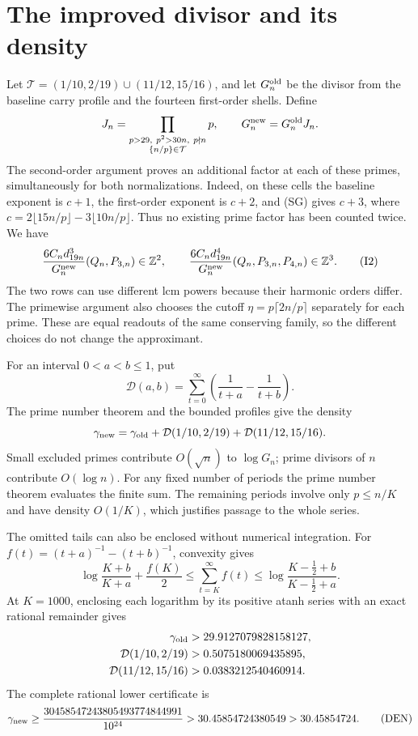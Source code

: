 \documentclass[11pt]{article}
\begin{document}
\section{The improved divisor and its density}
Let $\mathcal T=(1/10,2/19)\cup(11/12,15/16)$, and let
$G_n^{\rm old}$ be the divisor from the baseline carry profile and the
fourteen first-order shells. Define
\[
 J_n=\prod_{\substack{p>29,\ p^2>30n,\ p\nmid n\\
                  \{n/p\}\in\mathcal T}}p,
 \qquad G_n^{\rm new}=G_n^{\rm old}J_n.
\]
The second-order argument proves an additional factor at each of these
primes, simultaneously for both normalizations. Indeed, on these cells
the baseline exponent is $c+1$, the first-order exponent is $c+2$, and
(SG) gives $c+3$, where $c=2\lfloor15n/p\rfloor-3\lfloor10n/p\rfloor$.
Thus no existing prime factor has been counted twice. We have
\[
 \frac{6C_nd_{19n}^3}{G_n^{\rm new}}(Q_n,P_{3,n})\in\mathbb Z^2,
 \qquad
 \frac{6C_nd_{19n}^4}{G_n^{\rm new}}(Q_n,P_{3,n},P_{4,n})
     \in\mathbb Z^3.                                      \tag{I2}
\]
The two rows can use different lcm powers because their harmonic orders
differ. The primewise argument also chooses the cutoff
$\eta=p\lceil2n/p\rceil$ separately for each prime. These are equal
readouts of the same conserving family, so the different choices do not
change the approximant.

For an interval $0<a<b\le1$, put
\[
 \mathcal D(a,b)=\sum_{t=0}^{\infty}
             \left(\frac1{t+a}-\frac1{t+b}\right).
\]
The prime number theorem and the bounded profiles give the density
\[
 \gamma_{\rm new}=\gamma_{\rm old}
       +\mathcal D(1/10,2/19)+\mathcal D(11/12,15/16).
\]
Small excluded primes contribute $O(\sqrt n)$ to $\log G_n$; prime
divisors of $n$ contribute $O(\log n)$. For any fixed number of periods
the prime number theorem evaluates the finite sum. The remaining
periods involve only $p\le n/K$ and have density $O(1/K)$, which
justifies passage to the whole series.

The omitted tails can also be enclosed without numerical integration.
For $f(t)=(t+a)^{-1}-(t+b)^{-1}$, convexity gives
\[
 \log\frac{K+b}{K+a}+\frac{f(K)}2
 \le\sum_{t=K}^{\infty}f(t)
 \le\log\frac{K-\frac12+b}{K-\frac12+a}.
\]
At $K=1000$, enclosing each logarithm by its positive atanh series with
an exact rational remainder gives
\[
\begin{aligned}
 \gamma_{\rm old}&>29.9127079828158127,\\
 \mathcal D(1/10,2/19)&>0.5075180069435895,\\
 \mathcal D(11/12,15/16)&>0.0383212540460914.
\end{aligned}
\]
The complete rational lower certificate is
\[
 \gamma_{\rm new}\ge
 \frac{30458547243805493774844991}{10^{24}}
 >30.45854724380549>30.45854724.                         \tag{DEN}
\]
\end{document}
